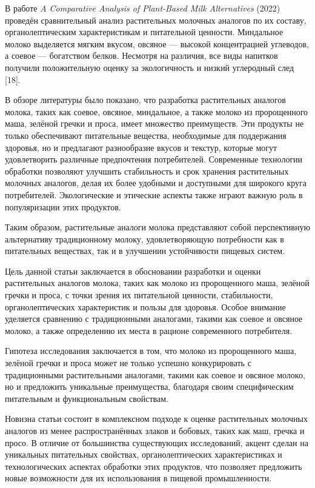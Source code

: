 В работе \emph{A Comparative Analysis of Plant-Based Milk Alternatives}
(2022) проведён сравнительный анализ растительных молочных аналогов по
их составу, органолептическим характеристикам и питательной ценности.
Миндальное молоко выделяется мягким вкусом, овсяное --- высокой
концентрацией углеводов, а соевое --- богатством белков. Несмотря на
различия, все виды напитков получили положительную оценку за
экологичность и низкий углеродный след {[}18{]}.

В обзоре литературы было показано, что разработка растительных аналогов
молока, таких как соевое, овсяное, миндальное, а также молоко из
пророщенного маша, зелёной гречки и проса, имеет множество преимуществ.
Эти продукты не только обеспечивают питательные вещества, необходимые
для поддержания здоровья, но и предлагают разнообразие вкусов и текстур,
которые могут удовлетворить различные предпочтения потребителей.
Современные технологии обработки позволяют улучшить стабильность и срок
хранения растительных молочных аналогов, делая их более удобными и
доступными для широкого круга потребителей. Экологические и этические
аспекты также играют важную роль в популяризации этих продуктов.

Таким образом, растительные аналоги молока представляют собой
перспективную альтернативу традиционному молоку, удовлетворяющую
потребности как в питательных веществах, так и в улучшении устойчивости
пищевых систем.

Цель данной статьи заключается в обосновании разработки и оценки
растительных аналогов молока, таких как молоко из пророщенного маша,
зелёной гречки и проса, с точки зрения их питательной ценности,
стабильности, органолептических характеристик и пользы для здоровья.
Особое внимание уделяется сравнению с традиционными аналогами, такими
как соевое и овсяное молоко, а также определению их места в рационе
современного потребителя.

Гипотеза исследования заключается в том, что молоко из пророщенного
маша, зелёной гречки и проса может не только успешно конкурировать с
традиционными растительными аналогами, такими как соевое и овсяное
молоко, но и предложить уникальные преимущества, благодаря своим
специфическим питательным и функциональным свойствам.

Новизна статьи состоит в комплексном подходе к оценке растительных
молочных аналогов из менее распространённых злаков и бобовых, таких как
маш, гречка и просо. В отличие от большинства существующих исследований,
акцент сделан на уникальных питательных свойствах, органолептических
характеристиках и технологических аспектах обработки этих продуктов, что
позволяет предложить новые возможности для их использования в пищевой
промышленности.

